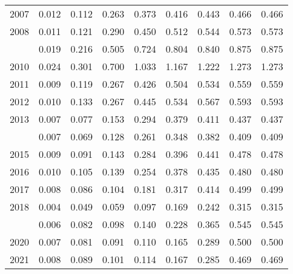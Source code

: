 \documentclass[
]{article}
\begin{document}
\begin{longtable}[t]{lrrrrrrrr}
2007 & 0.012 & 0.112 & 0.263 & 0.373 & 0.416 & 0.443 & 0.466 & 0.466\\
2008 & 0.011 & 0.121 & 0.290 & 0.450 & 0.512 & 0.544 & 0.573 & 0.573\\
\addlinespace
2009 & 0.019 & 0.216 & 0.505 & 0.724 & 0.804 & 0.840 & 0.875 & 0.875\\
2010 & 0.024 & 0.301 & 0.700 & 1.033 & 1.167 & 1.222 & 1.273 & 1.273\\
2011 & 0.009 & 0.119 & 0.267 & 0.426 & 0.504 & 0.534 & 0.559 & 0.559\\
2012 & 0.010 & 0.133 & 0.267 & 0.445 & 0.534 & 0.567 & 0.593 & 0.593\\
2013 & 0.007 & 0.077 & 0.153 & 0.294 & 0.379 & 0.411 & 0.437 & 0.437\\
\addlinespace
2014 & 0.007 & 0.069 & 0.128 & 0.261 & 0.348 & 0.382 & 0.409 & 0.409\\
2015 & 0.009 & 0.091 & 0.143 & 0.284 & 0.396 & 0.441 & 0.478 & 0.478\\
2016 & 0.010 & 0.105 & 0.139 & 0.254 & 0.378 & 0.435 & 0.480 & 0.480\\
2017 & 0.008 & 0.086 & 0.104 & 0.181 & 0.317 & 0.414 & 0.499 & 0.499\\
2018 & 0.004 & 0.049 & 0.059 & 0.097 & 0.169 & 0.242 & 0.315 & 0.315\\
\addlinespace
2019 & 0.006 & 0.082 & 0.098 & 0.140 & 0.228 & 0.365 & 0.545 & 0.545\\
2020 & 0.007 & 0.081 & 0.091 & 0.110 & 0.165 & 0.289 & 0.500 & 0.500\\
2021 & 0.008 & 0.089 & 0.101 & 0.114 & 0.167 & 0.285 & 0.469 & 0.469\\*
\end{longtable}
\end{document}
